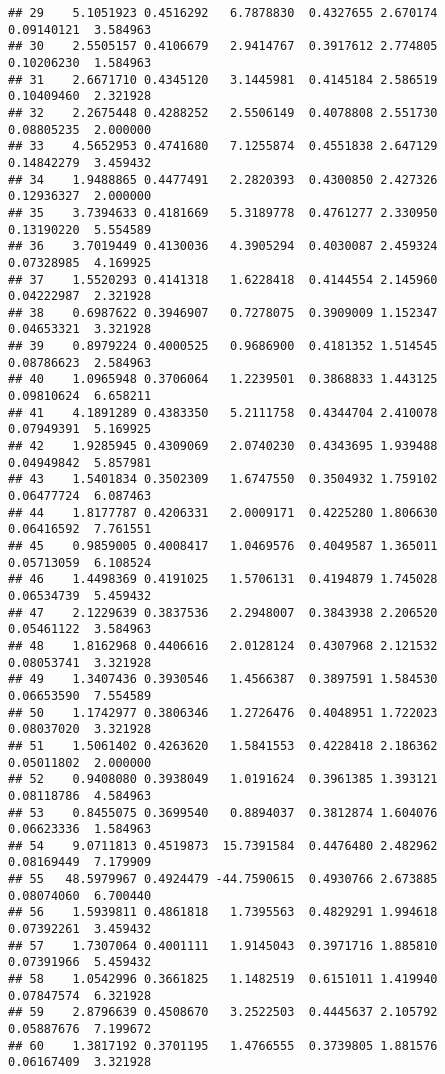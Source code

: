 \documentclass[]{article}
\begin{document}
\begin{verbatim}
## 29    5.1051923 0.4516292   6.7878830  0.4327655 2.670174 0.09140121  3.584963
## 30    2.5505157 0.4106679   2.9414767  0.3917612 2.774805 0.10206230  1.584963
## 31    2.6671710 0.4345120   3.1445981  0.4145184 2.586519 0.10409460  2.321928
## 32    2.2675448 0.4288252   2.5506149  0.4078808 2.551730 0.08805235  2.000000
## 33    4.5652953 0.4741680   7.1255874  0.4551838 2.647129 0.14842279  3.459432
## 34    1.9488865 0.4477491   2.2820393  0.4300850 2.427326 0.12936327  2.000000
## 35    3.7394633 0.4181669   5.3189778  0.4761277 2.330950 0.13190220  5.554589
## 36    3.7019449 0.4130036   4.3905294  0.4030087 2.459324 0.07328985  4.169925
## 37    1.5520293 0.4141318   1.6228418  0.4144554 2.145960 0.04222987  2.321928
## 38    0.6987622 0.3946907   0.7278075  0.3909009 1.152347 0.04653321  3.321928
## 39    0.8979224 0.4000525   0.9686900  0.4181352 1.514545 0.08786623  2.584963
## 40    1.0965948 0.3706064   1.2239501  0.3868833 1.443125 0.09810624  6.658211
## 41    4.1891289 0.4383350   5.2111758  0.4344704 2.410078 0.07949391  5.169925
## 42    1.9285945 0.4309069   2.0740230  0.4343695 1.939488 0.04949842  5.857981
## 43    1.5401834 0.3502309   1.6747550  0.3504932 1.759102 0.06477724  6.087463
## 44    1.8177787 0.4206331   2.0009171  0.4225280 1.806630 0.06416592  7.761551
## 45    0.9859005 0.4008417   1.0469576  0.4049587 1.365011 0.05713059  6.108524
## 46    1.4498369 0.4191025   1.5706131  0.4194879 1.745028 0.06534739  5.459432
## 47    2.1229639 0.3837536   2.2948007  0.3843938 2.206520 0.05461122  3.584963
## 48    1.8162968 0.4406616   2.0128124  0.4307968 2.121532 0.08053741  3.321928
## 49    1.3407436 0.3930546   1.4566387  0.3897591 1.584530 0.06653590  7.554589
## 50    1.1742977 0.3806346   1.2726476  0.4048951 1.722023 0.08037020  3.321928
## 51    1.5061402 0.4263620   1.5841553  0.4228418 2.186362 0.05011802  2.000000
## 52    0.9408080 0.3938049   1.0191624  0.3961385 1.393121 0.08118786  4.584963
## 53    0.8455075 0.3699540   0.8894037  0.3812874 1.604076 0.06623336  1.584963
## 54    9.0711813 0.4519873  15.7391584  0.4476480 2.482962 0.08169449  7.179909
## 55   48.5979967 0.4924479 -44.7590615  0.4930766 2.673885 0.08074060  6.700440
## 56    1.5939811 0.4861818   1.7395563  0.4829291 1.994618 0.07392261  3.459432
## 57    1.7307064 0.4001111   1.9145043  0.3971716 1.885810 0.07391966  5.459432
## 58    1.0542996 0.3661825   1.1482519  0.6151011 1.419940 0.07847574  6.321928
## 59    2.8796639 0.4508670   3.2522503  0.4445637 2.105792 0.05887676  7.199672
## 60    1.3817192 0.3701195   1.4766555  0.3739805 1.881576 0.06167409  3.321928

\end{verbatim}
\end{document}
